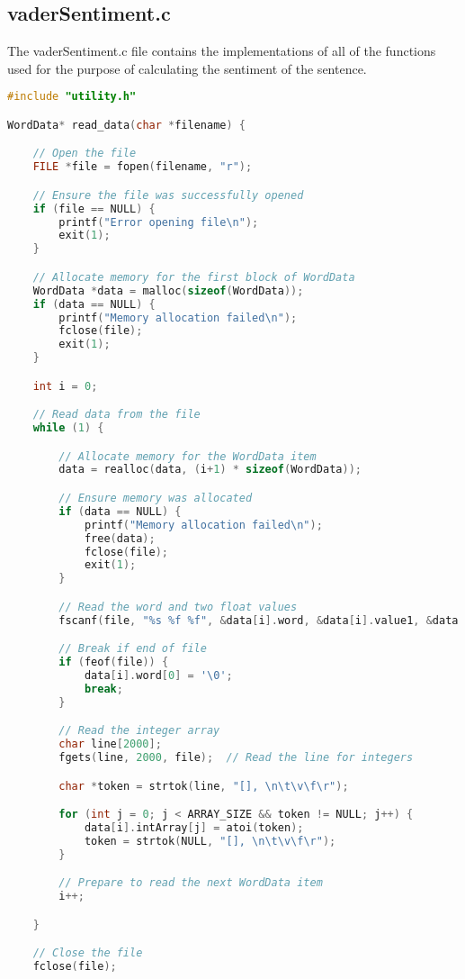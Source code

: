 \documentclass[12pt]{article}
\begin{document}
\subsection{vaderSentiment.c}

The vaderSentiment.c file contains the implementations of all of the functions used for the purpose of calculating the sentiment of the sentence.

\begin{lstlisting}[basicstyle=\tiny, language=c]
#include "utility.h"

WordData* read_data(char *filename) {

    // Open the file
    FILE *file = fopen(filename, "r");

    // Ensure the file was successfully opened
    if (file == NULL) {
        printf("Error opening file\n");
		exit(1);
    }

    // Allocate memory for the first block of WordData
    WordData *data = malloc(sizeof(WordData));
    if (data == NULL) {
        printf("Memory allocation failed\n");
        fclose(file);
		exit(1);
    }

    int i = 0;

    // Read data from the file
    while (1) {

		// Allocate memory for the WordData item
		data = realloc(data, (i+1) * sizeof(WordData));

		// Ensure memory was allocated
		if (data == NULL) {
			printf("Memory allocation failed\n");
			free(data);
			fclose(file);
			exit(1);
		}

        // Read the word and two float values
        fscanf(file, "%s %f %f", &data[i].word, &data[i].value1, &data[i].value2);

		// Break if end of file
		if (feof(file)) {
			data[i].word[0] = '\0';
			break;
		}

        // Read the integer array
        char line[2000];
        fgets(line, 2000, file);  // Read the line for integers

        char *token = strtok(line, "[], \n\t\v\f\r");

        for (int j = 0; j < ARRAY_SIZE && token != NULL; j++) {
            data[i].intArray[j] = atoi(token);
            token = strtok(NULL, "[], \n\t\v\f\r");
        }

        // Prepare to read the next WordData item
        i++;

    }

    // Close the file
    fclose(file);


\end{lstlisting}
\end{document}
